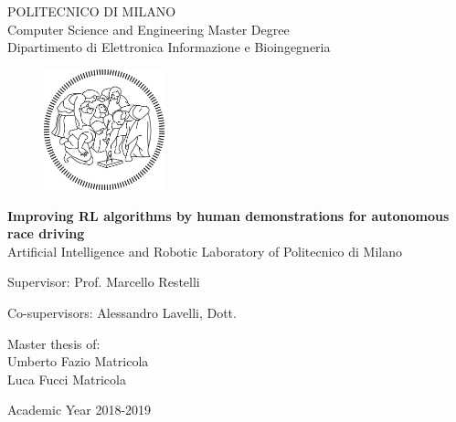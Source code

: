 \thispagestyle{empty}
\vspace*{-1.5cm}
 \bfseries{
\begin{center}
  \large
  POLITECNICO DI MILANO\\
  \normalsize
  Computer Science and Engineering Master Degree\\
  Dipartimento di Elettronica Informazione e Bioingegneria\\
  \begin{figure}[htbp]
    \begin{center}
      \includegraphics[width=3.5cm]{./img/logo/logo poli}
    \end{center}
  \end{figure}
  \vspace*{0.1cm} \LARGE


  \textbf{Improving RL algorithms by human demonstrations for autonomous race driving}\\


  \vspace*{.75truecm} \large
  Artificial Intelligence and Robotic Laboratory \newline of Politecnico di Milano
\end{center}
\vspace*{2.0cm} \large
\begin{flushleft}


  Supervisor: Prof. Marcello Restelli \\

  \begin{tabbing}  
      Co-supervisors: Alessandro Lavelli, Dott.

  \end{tabbing}
\end{flushleft}
\vspace*{1.0cm}
\begin{flushright}


  Master thesis of:\\ Umberto Fazio Matricola\\  Luca Fucci Matricola\\
 				    


\end{flushright}
\vspace*{0.8cm}
\begin{center}

  Academic Year 2018-2019
\end{center} \clearpage
}
